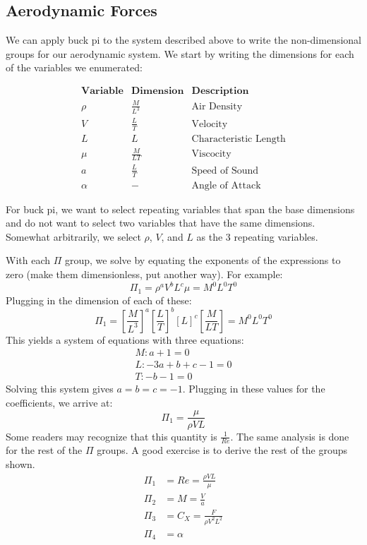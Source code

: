 \documentclass[10pt, openany, titlepage]{book}
\theoremstyle{definition}
\newcounter{example}[chapter]
\newcounter{exercise}[chapter]
\begin{document}
\subsection{Aerodynamic Forces}
    We can apply \gls{buck pi} to the system described above to write the non-dimensional groups for our aerodynamic system. We start by writing the dimensions for each of the variables we enumerated:

$$\begin{array}{ccc}
     \textbf{Variable} & \textbf{Dimension} & \textbf{Description}\\
      \rho & \frac{M}{L^3} & \text{Air Density}\\
     V    & \frac{L}{T} & \text{Velocity}\\
         L & L&\text{Characteristic Length}\\
     \mu &  \frac{M}{LT} & \text{Viscocity}\\
     a & \frac{L}{T} & \text{Speed of Sound}\\
     \alpha & - &\text{Angle of Attack}
\end{array}$$

For \gls{buck pi}, we want to select repeating variables that span the base dimensions and do not want to select two variables that have the same dimensions. Somewhat arbitrarily, we select $\rho$, $V$, and $L$ as the 3 repeating variables.

With each $\Pi$ group, we solve by equating the exponents of the expressions to zero (make them dimensionless, put another way). For example:
$$\Pi_1=\rho^aV^bL^c\mu=M^0L^0T^0$$
Plugging in the dimension of each of these:
$$\Pi_1=\left[\frac{M}{L^3}\right]^a\left[\frac{L}{T}\right]^b[L]^c\left[\frac{M}{LT}\right]=M^0L^0T^0$$
This yields a system of equations with three equations:
\begin{gather}
    M:a+1=0\\L:-3a+b+c-1=0\\T:-b-1=0
\end{gather}
Solving this system gives $a=b=c=-1$. Plugging in these values for the coefficients, we arrive at:
$$\Pi_1=\frac{\mu}{\rho VL}$$
Some readers may recognize that this quantity is $\frac{1}{Re}$.  The same analysis is done for the rest of the $\Pi$ groups. A good exercise is to derive the rest of the groups shown.
\begin{align}
    \Pi_1&=Re=\frac{\rho VL}{\mu}\\
    \Pi_2&=M=\frac{V}{a}\\
    \Pi_3&=C_X=\frac{F}{\rho V^2L^2}\\
    \Pi_4&=\alpha
\end{align}
\end{document}
